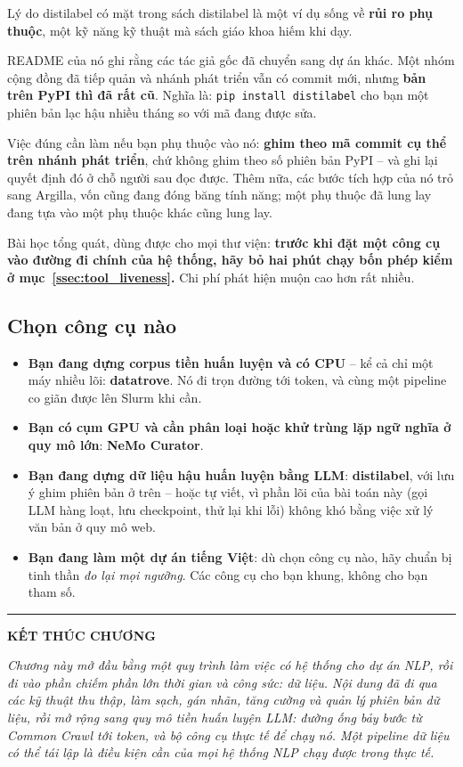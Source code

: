 \begin{keyidea}{Lý do distilabel có mặt trong sách}
distilabel là một ví dụ sống về \textbf{rủi ro phụ thuộc}, một kỹ năng kỹ thuật mà sách giáo khoa hiếm khi dạy.

README của nó ghi rằng các tác giả gốc đã chuyển sang dự án khác. Một nhóm cộng đồng đã tiếp quản và nhánh phát triển vẫn có commit mới, nhưng \textbf{bản trên PyPI thì đã rất cũ}. Nghĩa là: \texttt{pip install distilabel} cho bạn một phiên bản lạc hậu nhiều tháng so với mã đang được sửa.

Việc đúng cần làm nếu bạn phụ thuộc vào nó: \textbf{ghim theo mã commit cụ thể trên nhánh phát triển}, chứ không ghim theo số phiên bản PyPI -- và ghi lại quyết định đó ở chỗ người sau đọc được. Thêm nữa, các bước tích hợp của nó trỏ sang Argilla, vốn cũng đang đóng băng tính năng; một phụ thuộc đã lung lay đang tựa vào một phụ thuộc khác cũng lung lay.

Bài học tổng quát, dùng được cho mọi thư viện: \textbf{trước khi đặt một công cụ vào đường đi chính của hệ thống, hãy bỏ hai phút chạy bốn phép kiểm ở mục~\ref{ssec:tool_liveness}.} Chi phí phát hiện muộn cao hơn rất nhiều.
\end{keyidea}

\subsection{Chọn công cụ nào}
\label{ssec:data_tool_choice}

\begin{itemize}
	\item \textbf{Bạn đang dựng corpus tiền huấn luyện và có CPU} -- kể cả chỉ một máy nhiều lõi: \textbf{datatrove}. Nó đi trọn đường tới token, và cùng một pipeline co giãn được lên Slurm khi cần.
	\item \textbf{Bạn có cụm GPU và cần phân loại hoặc khử trùng lặp ngữ nghĩa ở quy mô lớn}: \textbf{NeMo Curator}.
	\item \textbf{Bạn đang dựng dữ liệu hậu huấn luyện bằng LLM}: \textbf{distilabel}, với lưu ý ghim phiên bản ở trên -- hoặc tự viết, vì phần lõi của bài toán này (gọi LLM hàng loạt, lưu checkpoint, thử lại khi lỗi) không khó bằng việc xử lý văn bản ở quy mô web.
	\item \textbf{Bạn đang làm một dự án tiếng Việt}: dù chọn công cụ nào, hãy chuẩn bị tinh thần \emph{đo lại mọi ngưỡng}. Các công cụ cho bạn khung, không cho bạn tham số.
\end{itemize}

\bigskip
\hrule
\bigskip

\begin{center}
    \textbf{\Large KẾT THÚC CHƯƠNG \thechapter}
\end{center}

\textit{Chương này mở đầu bằng một quy trình làm việc có hệ thống cho dự án NLP, rồi đi vào phần chiếm phần lớn thời gian và công sức: dữ liệu. Nội dung đã đi qua các kỹ thuật thu thập, làm sạch, gán nhãn, tăng cường và quản lý phiên bản dữ liệu, rồi mở rộng sang quy mô tiền huấn luyện LLM: đường ống bảy bước từ Common Crawl tới token, và bộ công cụ thực tế để chạy nó. Một pipeline dữ liệu có thể tái lập là điều kiện cần của mọi hệ thống NLP chạy được trong thực tế.}
